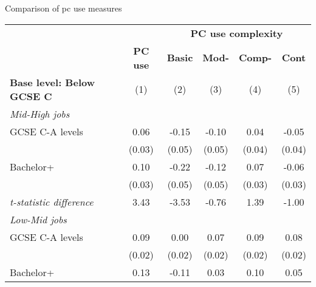 \begin{center}
\begin{threeparttable}[!h]
\caption{Comparison of pc use measures}
\label{tab:skillRegs}
\begin{tabular}{lccccc}
\toprule
\toprule
& & \multicolumn{4}{c}{\textbf{PC use complexity}} \\ \cline{3-6}
&\multicolumn{1}{c}{\textbf{PC use}}&\multicolumn{1}{c}{\textbf{Basic}}&\multicolumn{1}{c}{\textbf{Mod-}}&\multicolumn{1}{c}{\textbf{Comp-}}&\multicolumn{1}{c}{\textbf{Cont}} \\
\textbf{Base level: Below GCSE C}&\multicolumn{1}{c}{(1)}&\multicolumn{1}{c}{(2)}&\multicolumn{1}{c}{(3)}&\multicolumn{1}{c}{(4)}&\multicolumn{1}{c}{(5)} \\
\midrule
\textit{Mid-High jobs}\vspace{1mm} \\ 
\hspace{3mm}GCSE C-A levels&        0.06         &       -0.15\sym{**} &       -0.10\sym{*}  &        0.04         &       -0.05         \\
                    &      (0.03)         &      (0.05)         &      (0.05)         &      (0.04)         &      (0.04)         \\
\hspace{3mm}Bachelor+&        0.10\sym{**} &       -0.22\sym{***}&       -0.12\sym{*}  &        0.07\sym{*}  &       -0.06         \\
                    &      (0.03)         &      (0.05)         &      (0.05)         &      (0.03)         &      (0.03)         \\
\textit{t-statistic difference}&        3.43         &       -3.53         &       -0.76         &        1.39         &       -1.00         \\
\midrule\textit{Low-Mid jobs}\vspace{1mm} \\ 
\hspace{3mm}GCSE C-A levels&        0.09\sym{***}&        0.00         &        0.07\sym{***}&        0.09\sym{***}&        0.08\sym{***}\\
                    &      (0.02)         &      (0.02)         &      (0.02)         &      (0.02)         &      (0.02)         \\
\hspace{3mm}Bachelor+&        0.13\sym{***}&       -0.11\sym{***}&        0.03         &        0.10\sym{***}&        0.05\sym{*}  \\

\end{tabular}
\end{threeparttable}
\end{center}
